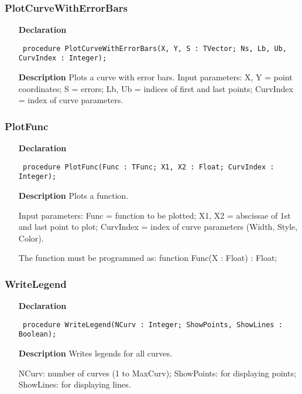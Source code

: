 \documentclass[12pt,a4paper,oneside]{report}
\newcommand{\declarationitem}[1]{\textbf{#1}}
\newcommand{\descriptiontitle}[1]{\textbf{#1}}
\newcommand{\code}[1]{\texttt{#1}}
\begin{document}
\subsubsection{PlotCurveWithErrorBars}
\label{uplot-PlotCurveWithErrorBars}
\begin{itemize}\item[\declarationitem{Declaration}\hfill]
	\begin{flushleft}
		\code{
			procedure PlotCurveWithErrorBars(X, Y, S : TVector; Ns, Lb, Ub, CurvIndex : Integer);}
		
	\end{flushleft}
	
	\par
	\item[\descriptiontitle{Description}]
	Plots a curve with error bars. Input parameters: X, Y = point coordinates; S = errors; Lb, Ub = indices of first and last points; CurvIndex = index of curve parameters.
	
\end{itemize}
\subsubsection{PlotFunc}
\label{uplot-PlotFunc}
\begin{itemize}\item[\declarationitem{Declaration}\hfill]
	\begin{flushleft}
		\code{
			procedure PlotFunc(Func : TFunc; X1, X2 : Float; CurvIndex : Integer);}
		
	\end{flushleft}
	
	\par
	\item[\descriptiontitle{Description}]
	Plots a function.
	
	Input parameters: Func = function to be plotted; X1, X2 = abscissae of 1st and last point to plot; CurvIndex = index of curve parameters (Width, Style, Color).
	
	The function must be programmed as: function Func(X : Float) : Float;
	
\end{itemize}
\subsubsection{WriteLegend}
\label{uplot-WriteLegend}
\begin{itemize}\item[\declarationitem{Declaration}\hfill]
	\begin{flushleft}
		\code{
			procedure WriteLegend(NCurv : Integer; ShowPoints, ShowLines : Boolean);}
		
	\end{flushleft}
	
	\par
	\item[\descriptiontitle{Description}]
	Writes legends for all curves.
	
	NCurv: number of curves (1 to MaxCurv); ShowPoints: for displaying points; ShowLines: for displaying lines.
	
\end{itemize}
\end{document}
